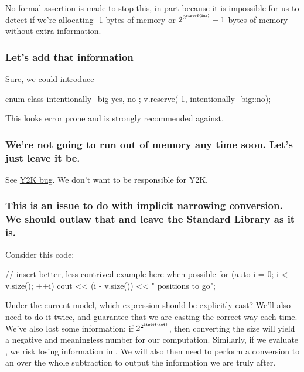No formal assertion is made to stop this, in part because it is impossible for us to detect if we're
allocating -1 bytes of memory or $2^{2^{\texttt{{sizeof(int)}}}} - 1$ bytes of memory without extra
information.

\subsubsection*{Let's add that information}
Sure, we could introduce

\begin{codeblock}
enum class intentionally_big { yes, no };
v.reserve(-1, intentionally_big::no);
\end{codeblock}

This looks error prone and is strongly recommended against.

\subsubsection*{We're not going to run out of memory any time soon. Let's just leave it be.}
See \href{https://en.wikipedia.org/wiki/Year_2000_problem}{Y2K bug}. We don't want to be responsible
for Y2K\Rplus\Rplus.

\subsubsection*{This is an issue to do with implicit narrowing conversion. We should outlaw that and
leave the Standard Library as it is.}

Consider this code:

\begin{codeblock}
// insert better, less-contrived example here when possible
for (auto i = 0; i < v.size(); ++i)
   cout << (i - v.size()) << " positions to go\n";
\end{codeblock}

Under the current model, which expression should be explicitly cast? We'll also need to do it twice,
and guarantee that we are casting the correct way each time. We've also lost some information: if
 $2^{2^{\texttt{sizeof(int)}}}$, then converting the size will yield a negative
and meaningless number for our computation. Similarly, if we evaluate
, we risk losing information in . We will also then
need to perform a conversion to an  over the whole subtraction to output the information
we are truly after.

